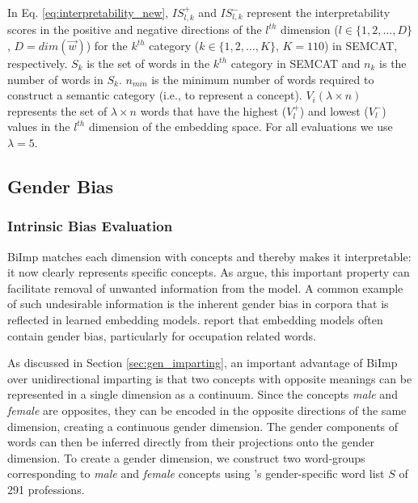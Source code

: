 \documentclass[11pt,a4paper]{article}
\def\proposedmethod{BiImp}
\begin{document}
In Eq. \ref{eq:interpretability_new}, $IS^+_{l,k}$ and
$IS^-_{l,k}$ represent the interpretability scores in the
positive and negative directions of the $l^{th}$ dimension
($l \in \{1,2,...,D\}$, $D=dim(\vec{w})$) for the $k^{th}$
category ($k \in \{1,2,...,K\}$, $K=110$) in SEMCAT,
respectively. $S_k$ is the set of words in the $k^{th}$
category in SEMCAT and $n_k$ is the number of words in
$S_k$. $n_{min}$ is the minimum number of words
required to construct a semantic category (i.e., to represent a
concept). $V_i(\lambda \times n)$ represents the set of
$\lambda \times n$ words that have the highest ($V_l^+$) and
lowest ($V_l^-$) values in the $l^{th}$ dimension of the embedding space. For all evaluations we use $\lambda=5$.


\subsection{Gender Bias} \label{sec:gender_bias}
 
\subsubsection{Intrinsic Bias Evaluation}

\proposedmethod{} 
matches each dimension with concepts and thereby makes it interpretable:
it now clearly represents specific
concepts.  As 
\citet{dufter19ultraDense} argue, this important property can
facilitate removal of unwanted information from the model. A
common example of such undesirable information is the
inherent gender bias in corpora that is reflected in learned
embedding models. \citet{bolukbasi16debiasing} report that
embedding models often contain gender bias, particularly for
occupation related words.


As discussed in Section \ref{sec:gen_imparting}, an
important advantage of \proposedmethod{} over
unidirectional imparting is that two concepts with opposite meanings
can be represented in a single dimension as a
continuum. Since the concepts \textit{male} and
\textit{female} are opposites, they can be encoded in the
opposite directions of the same dimension, creating a
continuous gender dimension. The gender components of
words can then be inferred directly from their projections onto
the gender dimension. To create a gender dimension,
we construct two word-groups corresponding to
\textit{male} and \textit{female} concepts using
\citep{bolukbasi16debiasing}'s gender-specific word list
$S$ of
291 professions.
\end{document}
